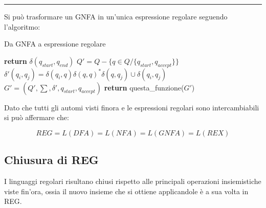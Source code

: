 \documentclass{article}
\begin{document}
\noindent\rule{\textwidth}{0.5pt}\newline

\newpage

\noindent Si può trasformare un GNFA in un'unica espressione regolare seguendo l'algoritmo:\newline

\begin{algorithm}[ht]
\caption{Da GNFA a espressione regolare}
\begin{algorithmic}
\State {}
    \State \textbf{return} $\delta(q_{start},q_{end})$
\Else 
    \State $Q'=Q-\{q\in Q/\{q_{start},q_{accept}\}\}$
            \State $\delta'(q_i,q_j)=\delta(q_i,q)\delta(q,q)^*\delta(q,q_j)\cup\delta(q_i,q_j)$
        \EndFor
    \EndFor
    \State $G'=(Q',\sum,\delta',q_{start},q_{accept})$
    \State \textbf{return} questa\_funzione($G'$)
\EndIf
\end{algorithmic}
\end{algorithm}

\noindent Dato che tutti gli automi visti finora e le espressioni regolari sono intercambiabili si può affermare che:

$$REG=L(DFA)=L(NFA)=L(GNFA)=L(REX)$$\newline

\subsection{Chiusura di REG}

I linguaggi regolari risultano chiusi rispetto alle principali operazioni insiemistiche viste fin'ora, ossia il nuovo insieme che si ottiene applicandole è a sua volta in REG.\newline
\end{document}

